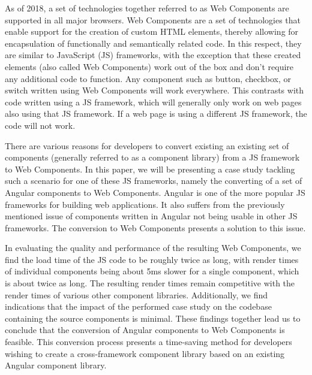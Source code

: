 As of 2018, a set of technologies together referred to as Web Components are supported in all major browsers. Web Components are a set of technologies that enable support for the creation of custom HTML elements, thereby allowing for encapsulation of functionally and semantically related code. In this respect, they are similar to JavaScript (JS) frameworks, with the exception that these created elements (also called Web Components) work out of the box and don't require any additional code to function. Any component such as button, checkbox, or switch written using Web Components will work everywhere. This contrasts with code written using a JS framework, which will generally only work on web pages also using that JS framework. If a web page is using a different JS framework, the code will not work. 

There are various reasons for developers to convert existing an existing set of components (generally referred to as a component library) from a JS framework to Web Components. In this paper, we will be presenting a case study tackling such a scenario for one of these JS frameworks, namely the converting of a set of Angular components to Web Components. Angular is one of the more popular JS frameworks for building web applications. It also suffers from the previously mentioned issue of components written in Angular not being usable in other JS frameworks. The conversion to Web Components presents a solution to this issue.

In evaluating the quality and performance of the resulting Web Components, we find the load time of the JS code to be roughly twice as long, with render times of individual components being about 5ms slower for a single component, which is about twice as long. The resulting render times remain competitive with the render times of various other component libraries. Additionally, we find indications that the impact of the performed case study on the codebase containing the source components is minimal. These findings together lead us to conclude that the conversion of Angular components to Web Components is feasible. This conversion process presents a time-saving method for developers wishing to create a cross-framework component library based on an existing Angular component library.